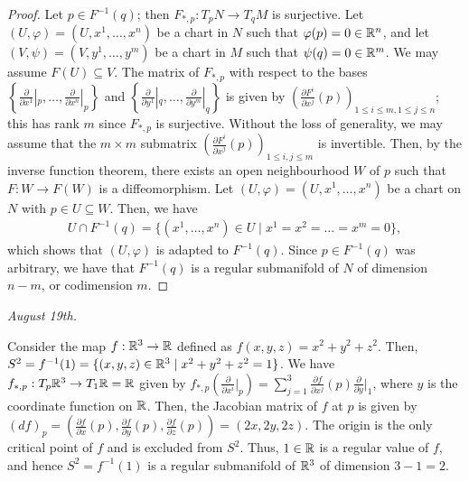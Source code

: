 \begin{proof}
    Let $p \in F^{-1}(q)$; then $F_{\ast,p}:T_{p}N \to T_{q}M$ is surjective. Let $(U,\varphi) = (U,x^{1},\ldots,x^{n})$ be a chart in $N$ such that $\varphi(p) = 0 \in \mathbb{R}^{n}$, and let $(V,\psi) = (V,y^{1},\ldots,y^{m})$ be a chart in $M$ such that $\psi(q) = 0 \in \mathbb{R}^{m}$. We may assume $F(U) \subseteq V$. The matrix of $F_{\ast,p}$ with respect to the bases $\left\{\frac{\partial}{\partial x^{1}}|_{p},\ldots,\frac{\partial}{\partial x^{n}}|_{p}\right\}$ and $\left\{\frac{\partial}{\partial y^{1}}|_{q},\ldots,\frac{\partial}{\partial y^{m}}|_{q}\right\}$ is given by $\left( \frac{\partial F^{i}}{\partial x^{j}}(p) \right)_{1 \leq i \leq m, 1 \leq j \leq n}$; this has rank $m$ since $F_{\ast,p}$ is surjective. Without the loss of generality, we may assume that the $m \times m$ submatrix $\left( \frac{\partial F^{i}}{\partial x^{j}}(p) \right)_{1 \leq i,j \leq m}$ is invertible. Then, by the inverse function theorem, there exists an open neighbourhood $W$ of $p$ such that $F:W \to F(W)$ is a diffeomorphism. Let $(U,\varphi) = (U,x^{1},\ldots,x^{n})$ be a chart on $N$ with $p \in U \subseteq W$. Then, we have
    \begin{align}
        U \cap F^{-1}(q) = \{(x^{1},\ldots,x^{n}) \in U \mid x^{1} = x^{2} = \ldots = x^{m} = 0\},
    \end{align}
    which shows that $(U,\varphi)$ is adapted to $F^{-1}(q)$. Since $p \in F^{-1}(q)$ was arbitrary, we have that $F^{-1}(q)$ is a regular submanifold of $N$ of dimension $n-m$, or codimension $m$.
\end{proof}

\textit{August 19th.}

\begin{example}
    Consider the map $f:\mathbb{R}^{3} \to \mathbb{R}$ defined as $f(x,y,z) = x^{2}+y^{2}+z^{2}$. Then, $S^{2} = f^{-1}(1) = \{(x,y,z) \in \mathbb{R}^{3} \mid x^{2}+y^{2}+z^{2} = 1\}$. We have $f_{\ast,p}:T_{p}\mathbb{R}^{3} \to T_{1}\mathbb{R} = \mathbb{R}$ given by $f_{\ast,p}\left(\frac{\partial}{\partial x^{i}}|_{p}\right) = \sum_{j=1}^{3} \frac{\partial f}{\partial x^{j}}(p) \frac{\partial}{\partial y}|_{1}$, where $y$ is the coordinate function on $\mathbb{R}$. Then, the Jacobian matrix of $f$ at $p$ is given by $(d f)_{p} = \left( \frac{\partial f}{\partial x}(p), \frac{\partial f}{\partial y}(p), \frac{\partial f}{\partial z}(p) \right) = (2x, 2y, 2z)$. The origin is the only critical point of $f$ and is excluded from $S^{2}$. Thus, $1 \in \mathbb{R}$ is a regular value of $f$, and hence $S^{2} = f^{-1}(1)$ is a regular submanifold of $\mathbb{R}^{3}$ of dimension $3-1 = 2$.
\end{example}

